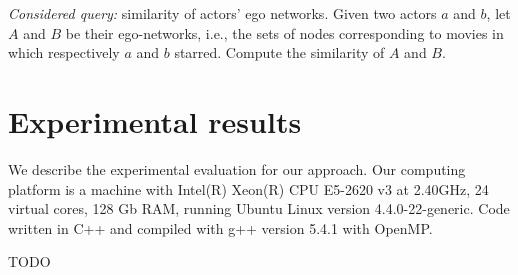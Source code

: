     \textsl{Considered query:} similarity of actors' ego networks. Given two actors $a$ and $b$, let $A$ and $B$ be their ego-networks, i.e., the sets of nodes corresponding to movies in which respectively $a$ and $b$ starred. Compute the similarity of $A$ and $B$.
    
    \section{Experimental results}

    We describe the experimental evaluation for our approach. Our computing platform is a machine with Intel(R) Xeon(R) CPU E5-2620 v3 at 2.40GHz, 24 virtual cores, 128 Gb RAM, running Ubuntu Linux version 4.4.0-22-generic. Code written in C++ and compiled with g++ version 5.4.1 with OpenMP. 
    
	TODO 